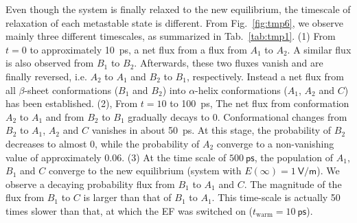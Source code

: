 \documentclass[a4paper,preprint,unsortedaddress,onecolumn]{revtex4-1}
\begin{document}
Even though the system is finally relaxed to the new equilibrium,
the timescale of relaxation of each metastable state is different. 
From Fig.~\ref{fig:tmp6}, we observe mainly
three different timescales, as summarized in Tab.~\ref{tab:tmp1}.
(1) From
$t=0$ to approximately 10~\textsf{ps}, a net flux from 
a flux from $A_1$ to $A_2$.
A similar flux is also observed from $B_1$ to $B_2$.
Afterwards, these two fluxes vanish and are finally reversed,
i.e. $A_2$ to $A_1$ and $B_2$ to $B_1$, respectively.
Instead a net flux from all $\beta$-sheet conformations
($B_1$ and $B_2$) into $\alpha$-helix conformations ($A_1$, $A_2$ and
$C$) has been established.
(2), From $t=10$ to
100~\textsf{ps},
The net flux from  conformation $A_2$ to $A_1$ and from $B_2$ to $B_1$
gradually decays to 0. Conformational changes from $B_2$ to $A_1$, $A_2$ and $C$
vanishes in about 50~ps.
At this stage, the probability of $B_2$ decreases to almost 0,
while the probability of $A_2$
converge to a non-vanishing value of approximately 0.06.
(3) At the time scale of $
500~\textsf{ps}$, the population of $A_1$, $B_1$ and $C$ converge to
the new equilibrium (system with $E(\infty) = 1~\textsf{V/m}$).
We observe a decaying probability flux from $B_1$ 
to $A_1$ and $C$.
The magnitude of the flux from $B_1$ to  $C$ is larger than that of $B_1$ to  $A_1$.
This time-scale is actually 50 times slower than that, at which
the EF was switched on ($t_{\textrm{warm}} = 10~\textsf{ps}$).
\end{document}
